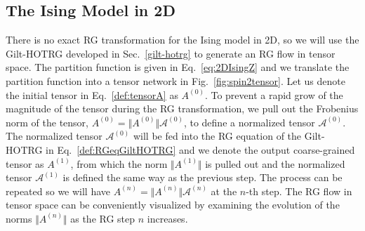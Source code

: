 \documentclass[aps,prb,reprint,superscriptaddress,floatfix]{revtex4-2}
\begin{document}
\subsection{The Ising Model in 2D\label{benchmark:2DIsing}}
There is no exact RG transformation for the Ising model in 2D, so we will
use the Gilt-HOTRG developed in Sec.~\ref{gilt-hotrg} to generate an RG flow
in tensor space. The partition function is given in
Eq.~\eqref{eq:2DIsingZ} and we translate the partition function into
a tensor network in Fig.~\ref{fig:spin2tensor}. Let us denote the
initial tensor in Eq.~\eqref{def:tensorA} as $A^{(0)}$. To prevent a
rapid grow of the magnitude of the tensor during the RG transformation, we
pull out the Frobenius norm of the tensor, $A^{(0)} = \Vert
A^{(0)}\Vert \mathcal{A}^{(0)}$, to define a normalized tensor
$\mathcal{A}^{(0)}$. The normalized tensor $\mathcal{A}^{(0)}$ will be
fed into the RG equation of the Gilt-HOTRG in Eq.~\eqref{def:RGeqGiltHOTRG}
and we denote the output coarse-grained tensor as $A^{(1)}$, from which
the norm $\Vert A^{(1)}\Vert$ is pulled out and the normalized tensor
$\mathcal{A}^{(1)}$ is defined the same way as the previous step. The
process can be repeated so we will have $A^{(n)} = \Vert A^{(n)}\Vert
\mathcal{A}^{(n)}$ at the $n$-th step. The RG flow in tensor space can
be conveniently visualized by examining the evolution of the norms
$\Vert A^{(n)}\Vert$ as the RG step $n$ increases.
\end{document}
